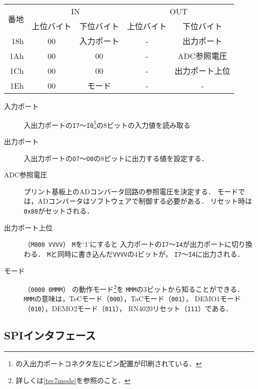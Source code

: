 \begin{center}
  \small\begin{tabular}{| r | c | c || c | c |}\hline
    \multirow{2}{*}{番地}
    & \multicolumn{2}{|c||}{IN}
    & \multicolumn{2}{c|}{OUT}
    \\\cline{2-5}
         & 上位バイト & 下位バイト & 上位バイト & 下位バイト
    \\\hline\hline
    18h  &  00 & 入力ポート
         &  -  & 出力ポート \\\hline
    1Ah  &  00 & 00
         &  -  & ADC参照電圧 \\\hline
    1Ch  &  00 & 00
         &  -  & 出力ポート上位 \\\hline
    1Eh  &  00 & モード
         &  - & - \\\hline
  \end{tabular}
\end{center}

\begin{description}
\item[入力ポート]
  入出力ポートの\texttt{I7}〜\texttt{I0}\footnote{
    の入出力ポートコネクタ左にピン配置が印刷されている．
  }の8ビットの入力値を読み取る
\item[出力ポート]
  入出力ポートの\texttt{O7}〜\texttt{O0}の8ビットに出力する値を設定する．
\item[ADC参照電圧]
  プリント基板上のADコンバータ回路の参照電圧を決定する．
  {\tac}モードでは，ADコンバータはソフトウェアで制御する必要がある．
  リセット時は\texttt{0x80}がセットされる．
\item[出力ポート上位]（\texttt{M000 VVVV}）
  \texttt{M}を`1'にすると
  入力ポートの\texttt{I7}〜\texttt{I4}が出力ポートに切り換わる．
  \texttt{M}と同時に書き込んだ\texttt{VVVV}の4ビットが，
  \texttt{I7}〜\texttt{I4}に出力される．
\item[モード]（\texttt{0000 0MMM}）
  {\tecS}の動作モード\footnote{詳しくは\ref{tec7mode}を参照のこと．}を
  \texttt{MMM}の3ビットから知ることができる．
  \texttt{MMM}の意味は，TeCモード（\texttt{000}），TaCモード（\texttt{001}），
  DEMO1モード（\texttt{010}），DEMO2モード（\texttt{011}），
  RN4020リセット（\texttt{111}）である．
\end{description}

\subsection{SPIインタフェース}

